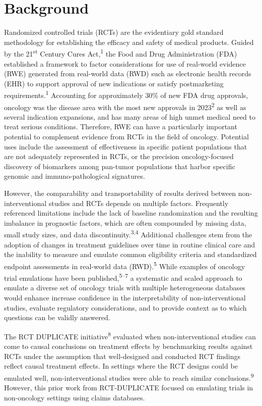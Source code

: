 \documentclass[
  letterpaper,
  DIV=11,
  numbers=noendperiod]{scrartcl}
\begin{document}
\newpage{}

\section{Background}\label{background}

Randomized controlled trials (RCTs) are the evidentiary gold standard
methodology for establishing the efficacy and safety of medical
products. Guided by the 21\textsuperscript{st} Century Cures
Act,\textsuperscript{1} the Food and Drug Administration (FDA)
established a framework to factor considerations for use of real-world
evidence (RWE) generated from real-world data (RWD) such as electronic
health records (EHR) to support approval of new indications or satisfy
postmarketing requirements.\textsuperscript{1} Accounting for
approximately 30\% of new FDA drug approvals, oncology was the disease
area with the most new approvals in 2023\textsuperscript{2} as well as
several indication expansions, and has many areas of high unmet medical
need to treat serious conditions. Therefore, RWE can have a particularly
important potential to complement evidence from RCTs in the field of
oncology. Potential uses include the assessment of effectiveness in
specific patient populations that are not adequately represented in
RCTs, or the precision oncology-focused discovery of biomarkers among
pan-tumor populations that harbor specific genomic and
immuno-pathological signatures.

However, the comparability and transportability of results derived
between non-interventional studies and RCTs depends on multiple factors.
Frequently referenced limitations include the lack of baseline
randomization and the resulting imbalance in prognostic factors, which
are often compounded by missing data, small study sizes, and data
discontinuity.\textsuperscript{3,4} Additional challenges stem from the
adoption of changes in treatment guidelines over time in routine
clinical care and the inability to measure and emulate common
eligibility criteria and standardized endpoint assessments in real-world
data (RWD).\textsuperscript{5} While examples of oncology trial
emulations have been published,\textsuperscript{5--7} a systematic and
scaled approach to emulate a diverse set of oncology trials with
multiple heterogeneous databases would enhance increase confidence in
the interpretability of non-interventional studies, evaluate regulatory
considerations, and to provide context as to which questions can be
validly answered.

The RCT DUPLICATE initiative\textsuperscript{8} evaluated when
non-interventional studies can come to causal conclusions on treatment
effects by benchmarking results against RCTs under the assumption that
well-designed and conducted RCT findings reflect causal treatment
effects. In settings where the RCT designs could be emulated well,
non-interventional studies were able to reach similar
conclusions.\textsuperscript{9} However, this prior work from
RCT-DUPLICATE focused on emulating trials in non-oncology settings using
claims databases.
\end{document}
